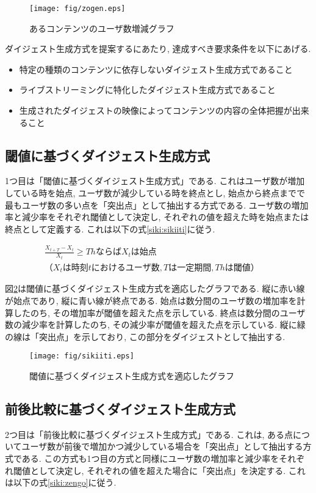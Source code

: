 \begin{figure}[h]
  \centering
  \texttt{[image: fig/zogen.eps]}
  \caption{あるコンテンツのユーザ数増減グラフ}
  \label{fig:zogen}
\end{figure}

ダイジェスト生成方式を提案するにあたり, 達成すべき要求条件を以下にあげる.

\begin{itemize}
\item 特定の種類のコンテンツに依存しないダイジェスト生成方式であること
\item ライブストリーミングに特化したダイジェスト生成方式であること
\item 生成されたダイジェストの映像によってコンテンツの内容の全体把握が出来ること
\end{itemize}

\subsection{閾値に基づくダイジェスト生成方式}
1つ目は「閾値に基づくダイジェスト生成方式」である. これはユーザ数が増加している時を始点, ユーザ数が減少している時を終点とし, 始点から終点までで最もユーザ数の多い点を「突出点」として抽出する方式である. ユーザ数の増加率と減少率をそれぞれ閾値として決定し, それぞれの値を超えた時を始点または終点として定義する. これは以下の式\ref{siki:sikiiti}に従う.

\begin{eqnarray}
\frac{X_{t+T}-X_{t}}{X_{t}} \geq ThならばX_{t}は始点 \nonumber \\
（X_{t}は時刻tにおけるユーザ数,Tは一定期間, Thは閾値）&&
\label{siki:sikiiti}
\end{eqnarray}

図\ref{fig:sikiiti}は閾値に基づくダイジェスト生成方式を適応したグラフである. 縦に赤い線が始点であり, 縦に青い線が終点である. 始点は数分間のユーザ数の増加率を計算したのち, その増加率が閾値を超えた点を示している. 終点は数分間のユーザ数の減少率を計算したのち, その減少率が閾値を超えた点を示している. 縦に緑の線は「突出点」を示しており, この部分をダイジェストとして抽出する.

\begin{figure}[h]
  \centering
  \texttt{[image: fig/sikiiti.eps]}
  \caption{閾値に基づくダイジェスト生成方式を適応したグラフ}
  \label{fig:sikiiti}
\end{figure}

\subsection{前後比較に基づくダイジェスト生成方式}
2つ目は「前後比較に基づくダイジェスト生成方式」である. これは, ある点についてユーザ数が前後で増加かつ減少している場合を「突出点」として抽出する方式である. この方式も1つ目の方式と同様にユーザ数の増加率と減少率をそれぞれ閾値として決定し, それぞれの値を超えた場合に「突出点」を決定する. これは以下の式\ref{siki:zengo}に従う.

